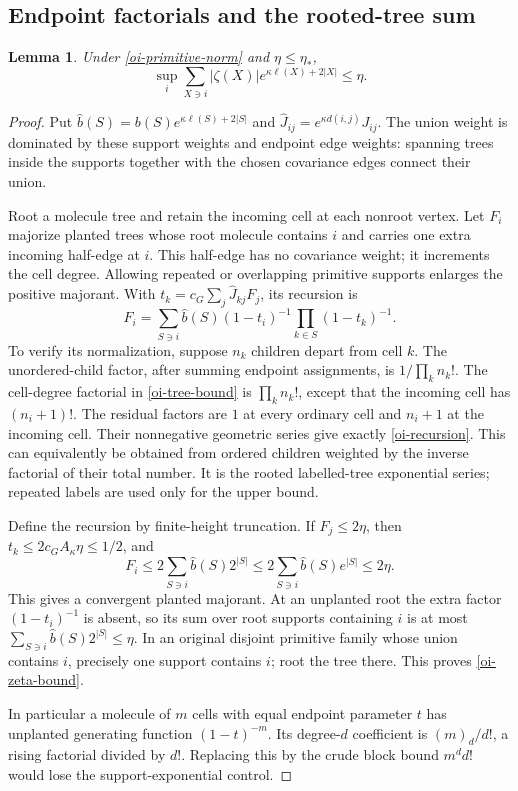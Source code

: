 \documentclass[11pt]{article}
\newtheorem{lemma}[theorem]{Lemma}
\theoremstyle{remark}
\begin{document}
\subsection{Endpoint factorials and the rooted-tree sum}

\begin{lemma}\label{oi-tree-lemma}
Under \eqref{oi-primitive-norm} and $\eta\le\eta_*$,
\begin{equation}\label{oi-zeta-bound}
 \sup_i\sum_{X\ni i}|\zeta(X)|
                  e^{\kappa\ell(X)+2|X|}\le\eta .
\end{equation}
\end{lemma}
\begin{proof}
Put $\widehat b(S)=b(S)e^{\kappa\ell(S)+2|S|}$ and
$\widehat J_{ij}=e^{\kappa d(i,j)}J_{ij}$.
The union weight is dominated by these support weights and endpoint
edge weights: spanning trees inside the supports together with
the chosen covariance edges connect their union.

Root a molecule tree and retain the incoming cell at each nonroot
vertex. Let $F_i$ majorize planted trees whose root molecule
contains $i$ and carries one extra incoming half-edge at $i$.
This half-edge has no covariance weight; it increments the cell
degree. Allowing repeated or overlapping primitive supports
enlarges the positive majorant. With
$t_k=c_G\sum_j\widehat J_{kj}F_j$, its recursion is
\begin{equation}\label{oi-recursion}
 F_i=\sum_{S\ni i}\widehat b(S)
              (1-t_i)^{-1}\prod_{k\in S}(1-t_k)^{-1}.
\end{equation}
To verify its normalization, suppose $n_k$ children depart from
cell $k$. The unordered-child factor, after summing endpoint
assignments, is $1/\prod_k n_k!$. The cell-degree factorial in
\eqref{oi-tree-bound} is $\prod_k n_k!$, except that the incoming
cell has $(n_i+1)!$. The residual factors are $1$ at every
ordinary cell and $n_i+1$ at the incoming cell. Their nonnegative
geometric series give exactly \eqref{oi-recursion}.
This can equivalently be obtained from ordered children weighted
by the inverse factorial of their total number. It is the rooted
labelled-tree exponential series; repeated labels are used only
for the upper bound.

Define the recursion by finite-height truncation. If $F_j\le2\eta$,
then $t_k\le2c_GA_\kappa\eta\le1/2$, and
\[
 F_i\le2\sum_{S\ni i}\widehat b(S)2^{|S|}
      \le2\sum_{S\ni i}\widehat b(S)e^{|S|}
      \le2\eta.
\]
This gives a convergent planted majorant. At an unplanted root
the extra factor $(1-t_i)^{-1}$ is absent, so its sum over root
supports containing $i$ is at most
$\sum_{S\ni i}\widehat b(S)2^{|S|}\le\eta$.
In an original disjoint primitive family whose union contains
$i$, precisely one support contains $i$; root the tree there.
This proves \eqref{oi-zeta-bound}.

In particular a molecule of $m$ cells with equal endpoint parameter
$t$ has unplanted generating function $(1-t)^{-m}$. Its degree-$d$
coefficient is $(m)_d/d!$, a rising factorial divided by $d!$.
Replacing this by the crude block bound $m^d d!$ would lose the
support-exponential control.
\end{proof}
\end{document}
